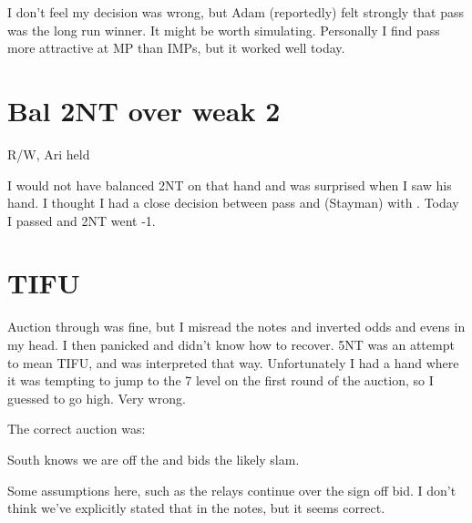 \documentclass[tom-ari]{subfile}
\begin{document}
I don't feel my decision was wrong, but Adam (reportedly) felt strongly that pass was the long run winner.  It might be worth simulating.  Personally I find pass more attractive at MP than IMPs, but it worked well today.

\section{Bal 2NT over weak 2}
\begin{uhold}
	R/W, Ari held 
\end{uhold}

I would not have balanced 2NT on that hand and was surprised when I saw his hand.  I thought I had a close decision between pass and  (Stayman) with .  Today I passed and 2NT went -1.

\section{TIFU}

\begin{handdiagram}
\end{handdiagram}

\begin{auctionplus}
\end{auctionplus}

Auction through  was fine, but I misread the notes and inverted odds and evens in my head. I then panicked and didn't know how to recover.  5NT was an attempt to mean TIFU, and was interpreted that way.  Unfortunately I had a hand where it was tempting to jump to the 7 level on the first round of the auction, so I guessed to go high.  Very wrong.

The correct auction was:

\begin{auctionplus}
\end{auctionplus}

South knows we are off the  and bids the likely slam.

Some assumptions here, such as the relays continue over the sign off bid.  I don't think we've explicitly stated that in the notes, but it seems correct.
\end{document}
